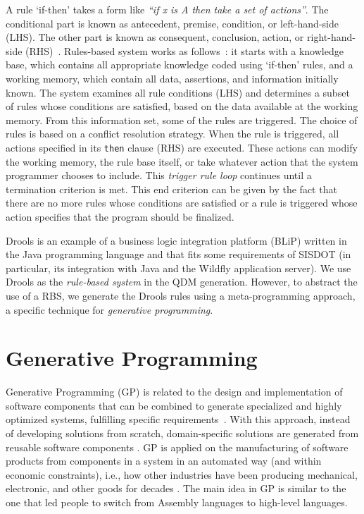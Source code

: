 A rule `if-then' takes a form like \emph{``if x is A then take a set of actions''}. 
The conditional part is known as antecedent, premise, condition, or left-hand-side (LHS). The other part 
is known as consequent, conclusion, action, or right-hand-side (RHS)~\cite{grosan2011,abraham2005}. 
Rules-based system works as follows~\cite{grosan2011}: it starts with a knowledge base, 
which contains all appropriate knowledge coded using `if-then' rules, and a working memory, 
which contain all data, assertions, and information initially known. The system examines all 
rule conditions (LHS) and determines a subset of rules whose conditions are satisfied, based on the data 
available at the working memory. From this information set, some of the rules are triggered. 
The choice of rules is based on a conflict resolution strategy. When the rule is triggered, 
all actions specified in its \texttt{then} clause (RHS) are executed. These actions can modify the 
working memory, the rule base itself, or take whatever action that the system programmer chooses to include. 
This \emph{trigger rule loop} continues until a termination criterion is met. This end criterion can be 
given by the fact that there are no more rules whose conditions are satisfied or a rule 
is triggered whose action specifies that the program should be finalized.

Drools is an example of a business logic integration platform (BLiP) written in the Java programming language and 
that fits some requirements of SISDOT (in particular, its integration with Java and the Wildfly application 
server). We use Drools as the \emph{rule-based system} in the QDM generation. However, to abstract the use 
of a RBS, we generate the Drools rules using a meta-programming approach, a specific technique for 
\emph{generative programming}. 

\section{Generative Programming}\label{sec:gp}

Generative Programming (GP) is related to the design and implementation of 
software components that can be combined to generate specialized and highly 
optimized systems, fulfilling specific requirements~\cite{czarnecki1998}. 
With this approach, instead of developing solutions from scratch, domain-specific 
solutions are generated from reusable software components \cite{arora2009}. 
GP is applied on the manufacturing of software products from components in a system 
in an automated way (and within economic constraints), i.e., how other industries have been 
producing mechanical, electronic, and other goods for decades \cite{barth2002}.
The main idea in GP is similar to the one that led people to switch from Assembly 
languages to high-level languages. 

